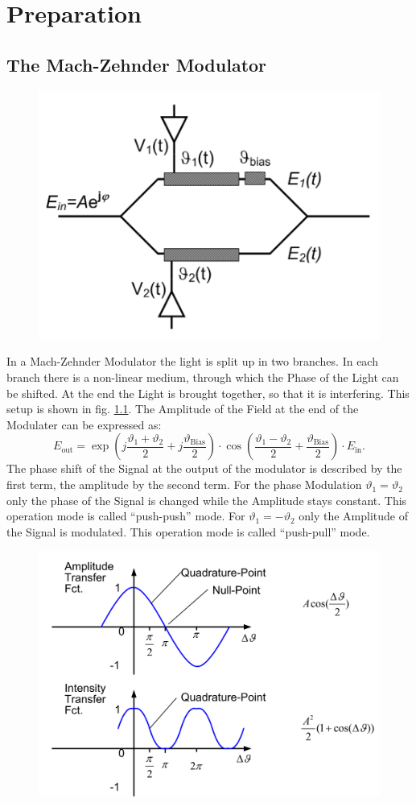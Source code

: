 \chapter{Preparation}
\section{The Mach-Zehnder Modulator}
\begin{figure}
  \centering
  \includegraphics[width=.5\columnwidth]{Grafiken/Mach-Zehnder.jpg}

\caption{}
\label{fig:MZI}
\end{figure}
In a Mach-Zehnder Modulator the light is split up in two branches. In each branch there is a non-linear medium, through which the Phase of the Light can be shifted. At the end the Light is brought together, so that it is interfering. This setup is shown in fig. \ref{fig:MZI}. The Amplitude of the Field at the end of the Modulater can be expressed as:
\begin{equation}
 E_{\mathrm{out}}=\exp\left(j\frac{\vartheta_1+\vartheta_2}{2}+j\frac{\vartheta_{\mathrm{Bias}}}{2} \right)\cdot\cos\left(\frac{\vartheta_1-\vartheta_2}{2}+\frac{\vartheta_{\mathrm{Bias}}}{2}\right)\cdot E_{\mathrm{in}} .
\end{equation}
The phase shift of the Signal at the output of the modulator is described by the first term, the amplitude by the second term. For the phase Modulation $\vartheta_1 = \vartheta_2$ only the phase of the Signal is changed while the Amplitude stays constant. This operation mode is called "`push-push"' mode. For $\vartheta_1 = -\vartheta_2$ only the Amplitude of the Signal is modulated. This operation mode is called "`push-pull"' mode.  \cite{OCS}

\begin{figure}
  \centering
  \includegraphics[width=.5\columnwidth]{Grafiken/Mach-Zender-Transfer.jpg}

\caption{}
\label{fig:MZI_plot}
\end{figure}


